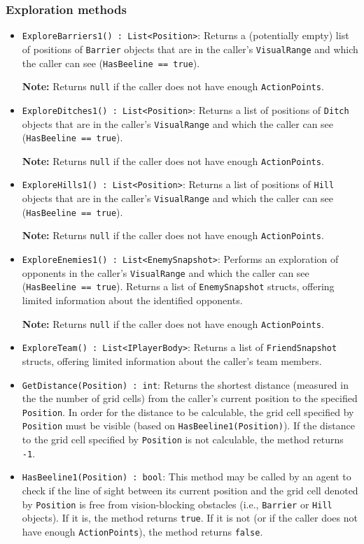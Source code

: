 \documentclass[a4paper,english,DIV=16,11pt,parskip=half,dvipsnames,listof=totoc,index=totoc,bibliography=totoc]{scrartcl}
\begin{document}
\subsubsection{Exploration methods} \label{sssec:explMeth}
\begin{itemize}
  \item \texttt{ExploreBarriers1() :~List<Position>}: Returns a (potentially empty) list of positions of \texttt{Barrier} objects that are in the caller's \texttt{VisualRange} and which the caller can see (\texttt{HasBeeline == true}).
  
  \faLightbulbO\: \textbf{Note:} Returns \texttt{null} if the caller does not have enough \texttt{ActionPoints}.
  \item \texttt{ExploreDitches1() :~List<Position>}: Returns a list of positions of \texttt{Ditch} objects that are in the caller's \texttt{VisualRange} and which the caller can see (\texttt{HasBeeline == true}).
  
  \faLightbulbO\: \textbf{Note:} Returns \texttt{null} if the caller does not have enough \texttt{ActionPoints}.
  \item \texttt{ExploreHills1() :~List<Position>}: Returns a list of positions of \texttt{Hill} objects that are in the caller's \texttt{VisualRange} and which the caller can see (\texttt{HasBeeline == true}).
  
  \faLightbulbO\: \textbf{Note:} Returns \texttt{null} if the caller does not have enough \texttt{ActionPoints}.
  \item \texttt{ExploreEnemies1() :~List<EnemySnapshot>}: Performs an exploration of opponents in the caller's \texttt{VisualRange} and which the caller can see (\texttt{HasBeeline == true}). Returns a list of \texttt{EnemySnapshot} structs, offering limited information about the identified opponents.
  
  \faLightbulbO\: \textbf{Note:} Returns \texttt{null} if the caller does not have enough \texttt{ActionPoints}.
  \item \texttt{ExploreTeam() :~List<IPlayerBody>}: Returns a list of \texttt{FriendSnapshot} structs, offering limited information about the caller's team members.
  \item \texttt{GetDistance(Position) :~int}: Returns the shortest distance (measured in the the number of grid cells) from the caller's current position to the specified \texttt{Position}. In order for the distance to be calculable, the grid cell specified by \texttt{Position} must be visible (based on \texttt{HasBeeline1(Position)}). If the distance to the grid cell specified by \texttt{Position} is not calculable, the method returns \texttt{-1}.
  \item \texttt{HasBeeline1(Position) :~bool}: This method may be called by an agent to check if the line of sight between its current position and the grid cell denoted by \texttt{Position} is free from vision-blocking obstacles (i.e., \texttt{Barrier} or \texttt{Hill} objects). If it is, the method returns \texttt{true}. If it is not (or if the caller does not have enough \texttt{ActionPoints}), the method returns \texttt{false}.


\end{itemize}
\end{document}

